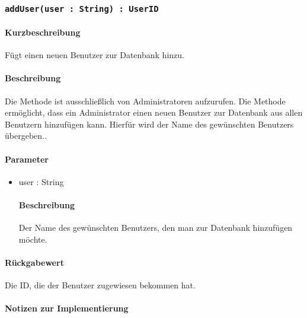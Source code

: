 \subsubsection{\texttt{addUser(user : String) : UserID}}%
\paragraph*{Kurzbeschreibung}
Fügt einen neuen Benutzer zur Datenbank hinzu.
\paragraph*{Beschreibung}
Die Methode ist ausschließlich von Administratoren aufzurufen.
Die Methode ermöglicht, dass ein Administrator einen neuen Benutzer zur Datenbank aus allen Benutzern hinzufügen kann.
Hierfür wird der Name des gewünschten Benutzers übergeben..
\paragraph*{Parameter}
\begin{itemize}
    \item user : String
    		\paragraph*{Beschreibung}
    		Der Name des gewünschten Benutzers, den man zur Datenbank hinzufügen möchte.
\end{itemize}
\paragraph*{Rückgabewert}
Die ID, die der Benutzer zugewiesen bekommen hat.

\paragraph*{Notizen zur Implementierung}%
